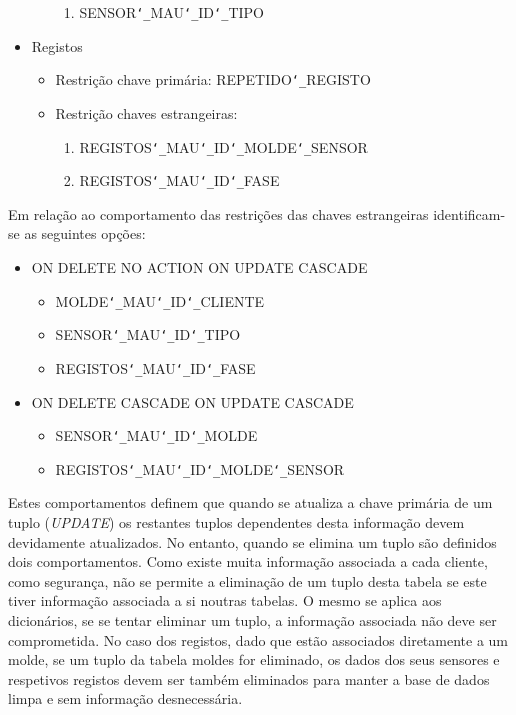 \documentclass[11pt,twoside,a4paper]{report}
\begin{document}
\begin{itemize}[noitemsep]
\begin{itemize}[noitemsep]
\begin{enumerate}
			\item SENSOR\texttt{\char`_}MAU\texttt{\char`_}ID\texttt{\char`_}TIPO
		\end{enumerate}
	\end{itemize}
	\item Registos
	\begin{itemize}[noitemsep]
		\item Restrição chave primária: REPETIDO\texttt{\char`_}REGISTO
		\item Restrição chaves estrangeiras:
		\begin{enumerate}
			\item REGISTOS\texttt{\char`_}MAU\texttt{\char`_}ID\texttt{\char`_}MOLDE\texttt{\char`_}SENSOR
			\item REGISTOS\texttt{\char`_}MAU\texttt{\char`_}ID\texttt{\char`_}FASE
		\end{enumerate}
	\end{itemize}
\end{itemize}
Em relação ao comportamento das restrições das chaves estrangeiras identificam-se as seguintes opções:
\begin{itemize}
	\item ON DELETE NO ACTION ON UPDATE CASCADE
	\begin{itemize}
		\item MOLDE\texttt{\char`_}MAU\texttt{\char`_}ID\texttt{\char`_}CLIENTE
		\item SENSOR\texttt{\char`_}MAU\texttt{\char`_}ID\texttt{\char`_}TIPO
		\item REGISTOS\texttt{\char`_}MAU\texttt{\char`_}ID\texttt{\char`_}FASE
	\end{itemize}
	\item ON DELETE CASCADE ON UPDATE CASCADE
	\begin{itemize}
		\item SENSOR\texttt{\char`_}MAU\texttt{\char`_}ID\texttt{\char`_}MOLDE
		\item REGISTOS\texttt{\char`_}MAU\texttt{\char`_}ID\texttt{\char`_}MOLDE\texttt{\char`_}SENSOR
	\end{itemize}
\end{itemize}
Estes comportamentos definem que quando se atualiza a chave primária de um tuplo (\textit{UPDATE}) os restantes tuplos dependentes desta informação devem devidamente atualizados. No entanto, quando se elimina um tuplo são definidos dois comportamentos. Como existe muita informação associada a cada cliente, como segurança, não se permite a eliminação de um tuplo desta tabela se este tiver informação associada a si noutras tabelas. O mesmo se aplica aos dicionários, se se tentar eliminar um tuplo, a informação associada não deve ser comprometida. No caso dos registos, dado que estão associados diretamente a um molde, se um tuplo da tabela moldes for eliminado, os dados dos seus sensores e respetivos registos devem ser também eliminados para manter a base de dados limpa e sem informação desnecessária.\par 
\end{document}
